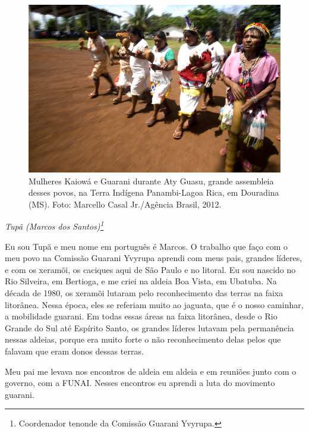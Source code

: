 \begin{figure}
  \centering
 \includegraphics[width=\textwidth]{./img/GUARANIS-img1.jpg}	
  \hfill
  \caption{Mulheres Kaiowá e Guarani durante Aty Guasu, grande assembleia desses
povos, na Terra Indígena Panambi-Lagoa Rica, em Douradina (MS). Foto:
Marcello Casal Jr./Agência Brasil, 2012.}
\end{figure}


 

\begin{flushright}
\emph{Tupã (Marcos dos Santos)\footnote{Coordenador tenonde da Comissão
Guarani Yvyrupa.}}
\end{flushright}
\medskip

Eu sou Tupã e meu nome em português é Marcos. O trabalho que faço com o
meu povo na Comissão Guarani Yvyrupa aprendi com meus pais, grandes
líderes, e com os xeramõi, os caciques aqui de São Paulo e no litoral.
Eu sou nascido no Rio Silveira, em Bertioga, e me criei na aldeia Boa
Vista, em Ubatuba. Na década de 1980, os xeramõi lutaram pelo
reconhecimento das terras na faixa litorânea. Nessa época, eles se
referiam muito ao jaguata, que é o nosso caminhar, a mobilidade
guarani. Em todas essas áreas na faixa litorânea, desde o Rio Grande do
Sul até Espírito Santo, os grandes líderes lutavam pela permanência
nessas aldeias, porque era muito forte o não reconhecimento delas pelos
que falavam que eram donos dessas terras. 

Meu pai me levava nos encontros de aldeia em aldeia e em reuniões junto
com o governo, com a FUNAI. Nesses encontros eu aprendi a luta do
movimento guarani. 

